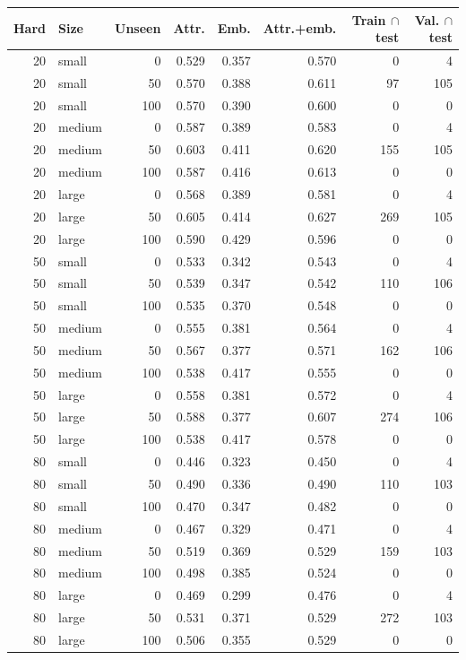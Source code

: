 \begin{tabular}{rlrrrrrr}
\toprule
Hard & Size & Unseen & Attr. & Emb. & Attr.+emb. & Train $\cap$ test & Val. $\cap$ test \\
\midrule
20 & small & 0 & 0.529 & 0.357 & 0.570 & 0 & 4 \\
20 & small & 50 & 0.570 & 0.388 & 0.611 & 97 & 105 \\
20 & small & 100 & 0.570 & 0.390 & 0.600 & 0 & 0 \\
20 & medium & 0 & 0.587 & 0.389 & 0.583 & 0 & 4 \\
20 & medium & 50 & 0.603 & 0.411 & 0.620 & 155 & 105 \\
20 & medium & 100 & 0.587 & 0.416 & 0.613 & 0 & 0 \\
20 & large & 0 & 0.568 & 0.389 & 0.581 & 0 & 4 \\
20 & large & 50 & 0.605 & 0.414 & 0.627 & 269 & 105 \\
20 & large & 100 & 0.590 & 0.429 & 0.596 & 0 & 0 \\
50 & small & 0 & 0.533 & 0.342 & 0.543 & 0 & 4 \\
50 & small & 50 & 0.539 & 0.347 & 0.542 & 110 & 106 \\
50 & small & 100 & 0.535 & 0.370 & 0.548 & 0 & 0 \\
50 & medium & 0 & 0.555 & 0.381 & 0.564 & 0 & 4 \\
50 & medium & 50 & 0.567 & 0.377 & 0.571 & 162 & 106 \\
50 & medium & 100 & 0.538 & 0.417 & 0.555 & 0 & 0 \\
50 & large & 0 & 0.558 & 0.381 & 0.572 & 0 & 4 \\
50 & large & 50 & 0.588 & 0.377 & 0.607 & 274 & 106 \\
50 & large & 100 & 0.538 & 0.417 & 0.578 & 0 & 0 \\
80 & small & 0 & 0.446 & 0.323 & 0.450 & 0 & 4 \\
80 & small & 50 & 0.490 & 0.336 & 0.490 & 110 & 103 \\
80 & small & 100 & 0.470 & 0.347 & 0.482 & 0 & 0 \\
80 & medium & 0 & 0.467 & 0.329 & 0.471 & 0 & 4 \\
80 & medium & 50 & 0.519 & 0.369 & 0.529 & 159 & 103 \\
80 & medium & 100 & 0.498 & 0.385 & 0.524 & 0 & 0 \\
80 & large & 0 & 0.469 & 0.299 & 0.476 & 0 & 4 \\
80 & large & 50 & 0.531 & 0.371 & 0.529 & 272 & 103 \\
80 & large & 100 & 0.506 & 0.355 & 0.529 & 0 & 0 \\
\bottomrule
\end{tabular}
